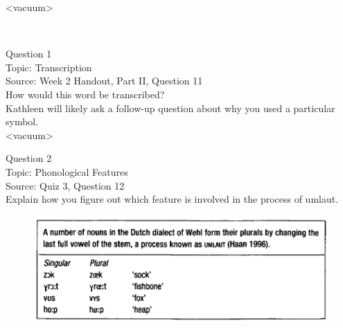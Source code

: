 \documentclass[12pt]{article}
\begin{document}
<vacuum>


\newpage

\begin{center}
\textbf{{\color{red}{\HUGE END OF EXAM}}}\\

\end{center}
\newpage

\begin{center}
\textbf{{\color{blue}{\HUGE START OF EXAM\\}}}

\textbf{{\color{blue}{\HUGE Student ID: 68058\\}}}

\textbf{{\color{blue}{\HUGE 4:20\\}}}

\end{center}
\newpage

{\large Question 1}\\

Topic: Transcription\\
Source: Week 2 Handout, Part II, Question 11\\

How would this word be transcribed?\\ Kathleen will likely ask a follow-up question about why you used a particular symbol.\\

<vacuum>


\newpage

{\large Question 2}\\

Topic: Phonological Features\\
Source: Quiz 3, Question 12\\

Explain how you figure out which feature is involved in the process of umlaut.\\

\begin{figure}[H]
\includegraphics{../images/dutch.png}
\end{figure}
\end{document}

